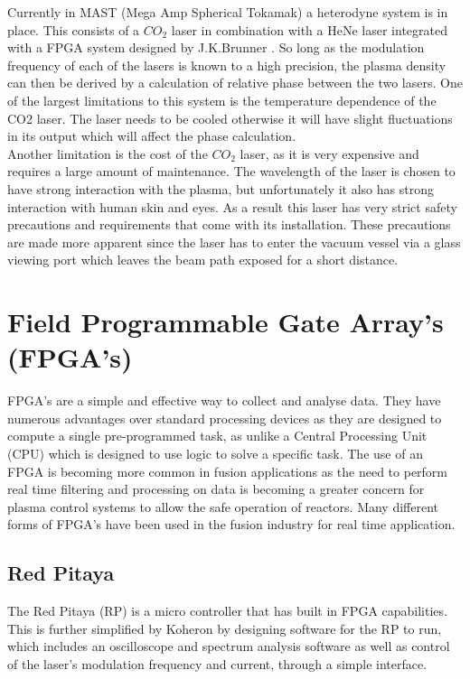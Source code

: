 \documentclass[12pt,a4paper,oneside]{report}
\begin{document}
Currently in MAST (Mega Amp Spherical Tokamak) a heterodyne system is in place. This consists of a $CO_{2}$ laser in combination with a HeNe laser integrated with a FPGA system designed by J.K.Brunner \cite{Brunner2017}. So long as the modulation frequency of each of the lasers is known to a high precision, the plasma density can then be derived by a calculation of relative phase between the two lasers. One of the largest limitations to this system is the temperature dependence of the CO2 laser. The laser needs to be cooled otherwise it will have slight fluctuations in its output which will affect the phase calculation.\\
Another limitation is the cost of the $CO_{2}$ laser, as it is very expensive and requires a large amount of maintenance. The wavelength of the laser is chosen to have strong interaction with the plasma, but unfortunately it also has strong interaction with human skin and eyes. As a result this laser has very strict safety precautions and requirements that come with its installation. These precautions are made more apparent since the laser has to enter the vacuum vessel via a glass viewing port which leaves the beam path exposed for a short distance.

	\section{Field Programmable Gate Array's (FPGA's)}
FPGA's are a simple and effective way to collect and analyse data. They have numerous advantages over standard processing devices as they are designed to compute a single pre-programmed task, as unlike a Central Processing Unit (CPU) which is designed to use logic to solve a specific task. The use of an FPGA is becoming more common in fusion applications as the need to perform real time filtering \cite{Naylor2010AnMAST} and processing on data is becoming a greater concern for plasma control systems to allow the safe operation of reactors. Many different forms of FPGA's have been used in the fusion industry for real time application.
	\subsection{Red Pitaya}
    
The Red Pitaya (RP) \cite{Leban2014RedManual} is a micro controller that has built in FPGA capabilities. This is further simplified by Koheron by designing software for the RP to run, which includes an oscilloscope and spectrum analysis software as well as control of the laser's modulation frequency and current, through a simple interface.
\end{document}
